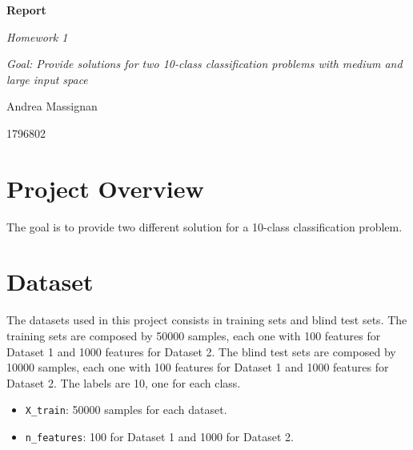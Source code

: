 \documentclass{article}
\begin{document}
\begin{titlepage}
  \centering
  \vspace*{2cm}
  {\Huge\bfseries Report\par}
  \vspace{2cm}
  {\Large\itshape Homework 1\par}
  \vspace{0.5cm}
  {\large\itshape Goal: Provide solutions for two 10-class classification problems with medium and large input space\par}
  \vfill
  {\Large Andrea Massignan\par}
  {\Large 1796802\par}
  \vfill
\end{titlepage}

\begin{titlepage}

  \section*{Project Overview}

  The goal is to provide two different solution for a 10-class classification problem.

  \section{Dataset}

  The datasets used in this project consists in training sets and blind test sets.
  The training sets are composed by 50000 samples, each one with 100 features for Dataset 1 and 1000 features for Dataset 2.
  The blind test sets are composed by 10000 samples, each one with 100 features for Dataset 1 and 1000 features for Dataset 2.
  The labels are 10, one for each class.

  \begin{itemize}
    \item \texttt{X\_train}: 50000 samples for each dataset.
    \item \texttt{n\_features}: 100 for Dataset 1 and 1000 for Dataset 2.

  \end{itemize}


\end{titlepage}
\end{document}
